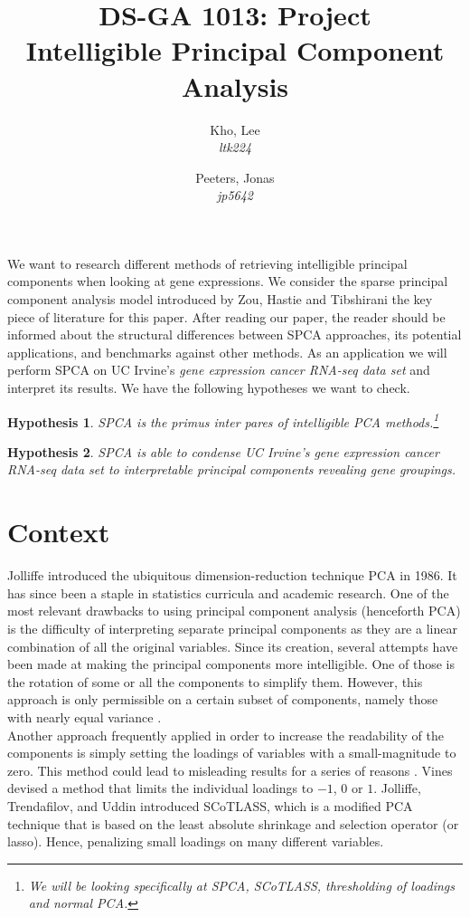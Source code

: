\documentclass[10pt,letterpaper]{article}
\author{
	Kho, Lee\\
	\textit{ltk224}
	\and
	Peeters, Jonas\\
	\textit{jp5642}
}
\title{DS-GA 1013: Project\\Intelligible Principal Component Analysis}
\newtheorem{hyp}{Hypothesis}
\begin{document}
\maketitle

We want to research different methods of retrieving intelligible principal components when looking at gene expressions. We consider the sparse principal component analysis model introduced by Zou, Hastie and Tibshirani \citeyear{Zou2006} the key piece of literature for this paper. After reading our paper, the reader should be informed about the structural differences between SPCA approaches, its potential applications, and benchmarks against other methods. As an application we will perform SPCA on UC Irvine's \textit{gene expression cancer RNA-seq data set} \cite{Dua2019} and interpret its results. We have the following hypotheses we want to check.
\begin{hyp}
SPCA is the primus inter pares of intelligible PCA methods.\footnote{We will be looking specifically at SPCA, SCoTLASS, thresholding of loadings and normal PCA.}
\end{hyp}
\begin{hyp}
SPCA is able to condense UC Irvine's \textit{gene expression cancer RNA-seq data set} to interpretable principal components revealing gene groupings.
\end{hyp}

\section*{Context}
Jolliffe \citeyear{Jolliffe1986} introduced the ubiquitous dimension-reduction technique PCA in 1986. It has since been a staple in statistics curricula and academic research. One of the most relevant drawbacks to using principal component analysis (henceforth PCA) is the difficulty of interpreting separate principal components as they are a linear combination of all the original variables. Since its creation, several attempts have been made at making the principal components more intelligible. One of those is the rotation of some or all the components to simplify them. However, this approach is only permissible on a certain subset of components, namely those with nearly equal variance \cite{Jolliffe1989, Jolliffe1995}.\\

Another approach frequently applied in order to increase the readability of the components is simply setting the loadings of variables with a small-magnitude to zero. This method could lead to misleading results for a series of reasons \cite{Cadima1995}. Vines \citeyear{Vines2000} devised a method that limits the individual loadings to $-1$, $0$ or $1$. Jolliffe, Trendafilov, and Uddin \citeyear{Jolliffe2003} introduced SCoTLASS, which is a modified PCA technique that is based on the least absolute shrinkage and selection operator (or lasso). Hence, penalizing small loadings on many different variables.\\
\end{document}
